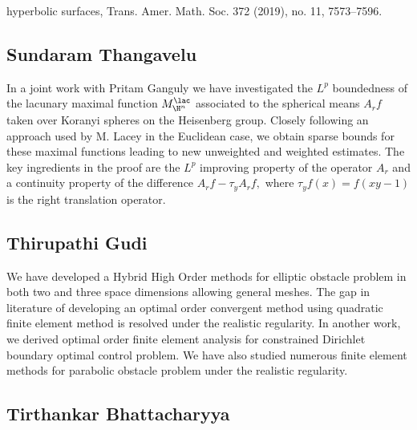 hyperbolic surfaces, Trans. Amer. Math. Soc. 372 (2019), no. 11, 7573–7596. 


\subsection{Sundaram Thangavelu}

In a joint work with Pritam Ganguly  we have investigated the $ L^p $  boundedness of the lacunary maximal function $ M_{\H^n}^\lac $ associated to the spherical means $ A_r f$  taken over Koranyi spheres on the Heisenberg group. Closely following an approach used by M. Lacey in the Euclidean case, we obtain sparse bounds for these maximal functions leading to new unweighted and weighted estimates. The key ingredients in the proof are the $L^p$  improving property of the operator $ A_r $  and a continuity property of the difference $ A_r f−\tau_y A_r f,$ where $\tau_yf(x)=f(xy−1) $ is the right translation operator. 


\subsection{Thirupathi Gudi}

We have developed a Hybrid High Order methods for elliptic obstacle problem in both two and three space dimensions allowing general meshes. The gap in literature of developing an optimal order convergent method using quadratic finite element method is resolved under the realistic regularity. In another work, we derived optimal order finite element analysis for constrained Dirichlet boundary optimal control problem. We have also studied numerous finite element methods for parabolic obstacle problem under the realistic regularity. 


\subsection{Tirthankar Bhattacharyya}

